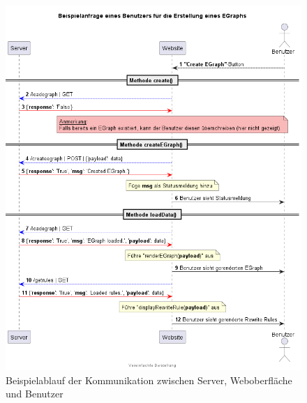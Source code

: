 \begin{figure}[H]
  \centering
  \includegraphics[scale=0.6]{../fig/query.png}
  \caption{Beispielablauf der Kommunikation zwischen Server, Weboberfläche und Benutzer}
  \label{fig:ablauf}
\end{figure}

